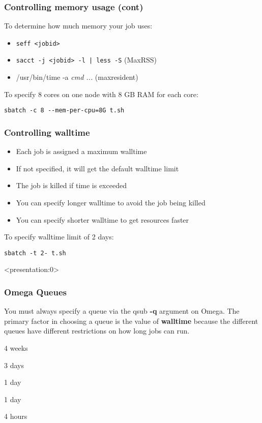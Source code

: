 \documentclass[10pt]{beamer}
\begin{document}
\begin{frame}[fragile]
\frametitle{Controlling memory usage (cont)}

To determine how much memory your job uses:
\begin{itemize}
\item \verb+seff <jobid>+ 
\item \verb+sacct -j <jobid> -l | less -S+ (MaxRSS) 
\item /usr/bin/time -a \textit{cmd ...} (maxresident)
\end{itemize}

To specify 8 cores on one node with 8 GB RAM for each core:
\begin{verbatim}
sbatch -c 8 --mem-per-cpu=8G t.sh
\end{verbatim}
\end{frame}

\begin{frame}[fragile]
\frametitle{Controlling walltime}
\begin{itemize}
\item Each job is assigned a maximum walltime
\item If not specified, it will get the default walltime limit
\item The job is killed if time is exceeded
\item You can specify longer walltime to avoid the job being killed
\item You can specify shorter walltime to get resources faster
\end{itemize}

To specify walltime limit of 2 days:
\begin{verbatim}
sbatch -t 2- t.sh

\end{verbatim}
\end{frame}

\begin{frame}<presentation:0>
\frametitle{Omega Queues}
You must always specify a queue via the qsub \textbf{-q} argument on
Omega.  The primary factor in choosing a queue is the value of
\textbf{walltime} because the different queues have different
restrictions on how long jobs can run.

\vskip10pt
\begin{description}
\item[fas\_very\_long]       4 weeks
\item[fas\_long]             3 days
\item[fas\_high]             1 day
\item[fas\_normal]           1 day
\item[fas\_devel]            4 hours
\end{description}

\end{frame}
\end{document}
